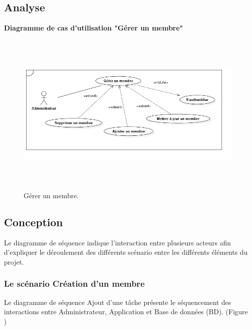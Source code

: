

\subsection{Analyse}

    \textbf{ Diagramme de cas d'utilisation "G\'{e}rer un membre"}
    \begin{figure}[H]
    \center
    \includegraphics[width=13cm,height=8cm]{./figures/ucM.png}
    \caption{G\'{e}rer un membre.}

    \end{figure}

\subsection{Conception}

Le diagramme de s\'{e}quence indique l'interaction entre plusieurs acteurs
afin d'expliquer le d\'{e}roulement des diff\'{e}rents sc\'{e}nario entre les diff\'{e}rents
\'{e}l\'{e}ments du projet.

\subsubsection{Le sc\'{e}nario \guillemotleft{} Cr\'{e}ation d'un membre \guillemotright{}}

Le diagramme de s\'{e}quence \guillemotleft{} Ajout d'une t\^{a}che \guillemotright{} pr\'{e}sente le s\'{e}quencement
des interactions entre Administrateur, Application et Base de donn\'{e}es (BD). (Figure )


